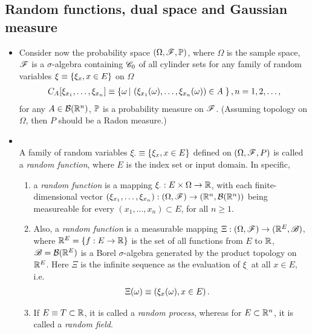 \documentclass[11pt]{article}
\begin{document}
\subsection{Random functions, dual space and Gaussian measure}
\begin{itemize}
\item Consider now the probability space $(\Omega, {\mathscr F}, {\mathbb P})$, where $\Omega$ is the sample space,  ${\mathscr F}$ is a $\sigma$-algebra containing ${\mathscr C}_{0}$ of all cylinder sets for any family of random variables  $\xi \equiv \left\{\xi_{x}, x\in E\right\}$ on $\Omega$ 
\begin{align*}
C_{A}[\xi_{x_1},\ldots, \xi_{x_n}]\equiv \left\{\omega\,|\, \left(\xi_{x_1}(\omega),  \ldots, \xi_{x_n}(\omega)\right) \in A\;  \right\}, n=1,2,\ldots,
\end{align*}for any $A\in {\mathcal B}({\mathbb R}^{n})$, ${\mathbb P}$ is a probability measure on ${\mathscr F}$. (Assuming topology on $\Omega$, then $P$ should be a Radon measure.) \\


\item \begin{definition}\citep{lifshits2013gaussian, rasmussen2006gaussian}\\
A family of random variables $\xi_{\cdot} \equiv \left\{\xi_{x}, x\in E\right\}$ defined on $(\Omega, {\mathscr F}, P)$ is called a \emph{random function}, where $E$ is the index set or input domain.  In specific, 
\begin{enumerate}
\item a \emph{random function} is a mapping $\xi_{\cdot}: E\times \Omega \rightarrow {\mathbb R}$, with each finite-dimensional vector $(\xi_{x_1}, \ldots, \xi_{x_n}): (\Omega,{\mathscr F}) \rightarrow ({\mathbb R}^{n}, {\mathcal B}({\mathbb R}^{n}))$ being measureable for every $(x_{1}, \ldots, x_{n})\subset E$, for all $n\ge 1$.

\item Also, a \emph{random function} is a measurable mapping $\Xi: (\Omega, {\mathscr F}) \rightarrow ({\mathbb R}^{E}, {\mathscr B})$, where ${\mathbb R}^{E}= \left\{f: E \rightarrow {\mathbb R}\right\}$ is the set of all functions from $E$ to ${\mathbb R}$,  ${\mathscr B}={\mathcal B}({\mathbb R}^{E})$ is a Borel $\sigma$-algebra  generated by the product topology on ${\mathbb R}^{E}$. Here $\Xi$ is the infinite sequence as the evaluation of $\xi_{\cdot}$ at all $x\in E$, i.e.
\begin{align*}
\Xi(\omega) &\equiv \left(\xi_{x}(\omega), x\in E\right).
\end{align*}

\item  If $E\equiv T\subset {\mathbb R}$, it is called a \emph{random process}, whereas for $E\subset {\mathbb R}^{n}$, it is called a \emph{random field}.  


\end{enumerate}
\end{definition}
\end{itemize}
\end{document}
